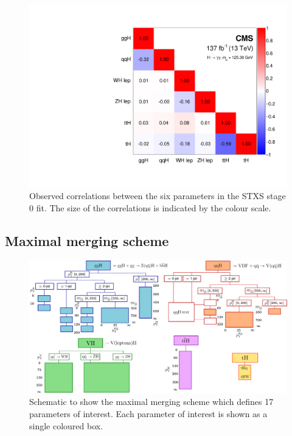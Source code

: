 \begin{figure}[htb!]
  \centering
  \includegraphics[width=.55\textwidth]{Figures/hgg_results/stage0_correlations.pdf}
  \caption[Correlations in the STXS stage 0 parameters]
  {
    Observed correlations between the six parameters in the STXS stage 0 fit. The size of the correlations is indicated by the colour scale.
  }
  \label{fig:stage0_correlations}
\end{figure}

\FloatBarrier
\subsection{Maximal merging scheme}
\begin{figure}[htb!]
  \centering
  \includegraphics[width=1\linewidth]{Figures/app_merging_schemes/allSTXSbins_maximal.pdf}
  \caption[Schematic of the maximal merging scheme]
  {
    Schematic to show the maximal merging scheme which defines 17 parameters of interest. Each parameter of interest is shown as a single coloured box.
  }
  \label{fig:maximal_scheme}
\end{figure}


